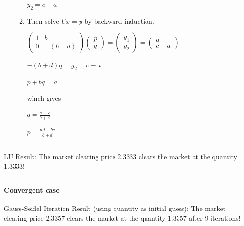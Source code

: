 \documentclass{article}
\begin{document}
\begin{enumerate}
\begin{enumerate}
 \begin{center} $y_2=c-a$ \end{center}
\item Then solve $Ux=y$ by backward induction.
 \begin{center} $\begin{pmatrix}
  1 & b \\
  0 & -(b+d)
 \end{pmatrix}
 \begin{pmatrix}
  p \\
  q
 \end{pmatrix}
 =
   \begin{pmatrix}
  y_1 \\
  y_2
 \end{pmatrix}
 =
  \begin{pmatrix}
  a \\
  c-a
 \end{pmatrix}$ \end{center}
 \begin{center}$ -(b+d)q=y_2=c-a $ \end{center}
 \begin{center}$p+b q=a $ \end{center}
which gives
 \begin{center}$ q=\frac{a-c}{b+d} $ \end{center}
 \begin{center}$ p = \frac{ad+bc}{b+d} $ \end{center}
\end{enumerate}
\end{enumerate}

\newpage
\subsection{}


LU Result: The market clearing price 2.3333 clears the market at the quantity 1.3333!


\subsection{}

\paragraph{Convergent case}


Gauss-Seidel Iteration Result (using quantity as initial guess): The market clearing price 2.3357 clears the market at the quantity 1.3357 after 9 iterations!\\[2em]
\end{document}
